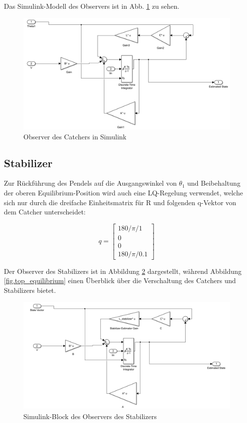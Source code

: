 Das Simulink-Modell des Observers ist in Abb. \ref{fig.obs_catcher} zu sehen.

\begin{figure}[htbp]
	\centering	
	\includegraphics[width=1\textwidth]{Grafiken/simulink_observer_catcher.png}
	\caption{Observer des Catchers in Simulink}
	\label{fig.obs_catcher}
\end{figure}

\subsection{Stabilizer}
\label{stabilizer} 

Zur Rückführung des Pendels auf die Ausgangswinkel von $\theta_1$ und Beibehaltung der oberen Equilibrium-Position wird auch eine LQ-Regelung verwendet, welche sich nur durch die dreifache Einheitsmatrix für R und folgenden q-Vektor von dem Catcher unterscheidet:

\begin{equation}
q =\begin{bmatrix}
         180/\pi/1 \\
         0\\
         0\\
         180/\pi/0.1
        \end{bmatrix}
\end{equation}

Der Observer des Stabilizers ist in Abbildung \ref{fig.obs_stabilizer} dargestellt, während Abbildung \ref{fig.top_equilibrium} einen Überblick über die Verschaltung des Catchers und Stabilizers bietet.

\begin{figure}[htbp]
	\centering	
	\includegraphics[width=1\textwidth]{Grafiken/simulink_observer_stabilizer.png}
	\caption{Simulink-Block des Observers des Stabilizers}
	\label{fig.obs_stabilizer}
\end{figure}


